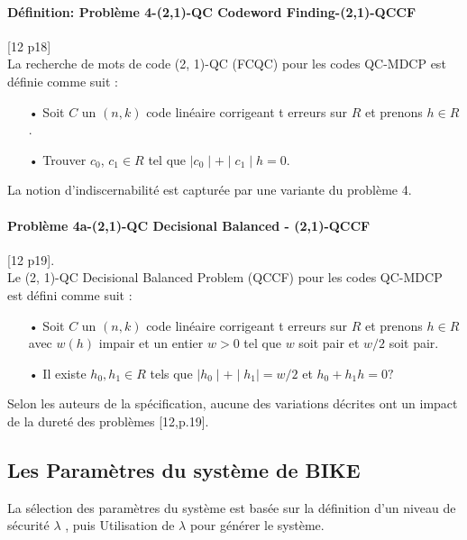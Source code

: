 \documentclass[12pt,openany]{report}
\begin{document}
\paragraph{Définition: Problème 4-(2,1)-QC Codeword Finding-(2,1)-QCCF}[12 p18]
\\
La recherche de mots de code (2, 1)-QC (FCQC) pour les codes QC-MDCP est définie comme suit :

\begin{itemize}
\item[•] Soit $\mathit{C}$ un $(n,k)$ code linéaire corrigeant t erreurs sur $ \mathit{R}$ et prenons $ h \in \mathit{R}$.
\item[•] Trouver $c_0$, $c_1 \in \mathit{R}$ tel que $ \mid c_0\mid +\mid c_1 \mid h=0$.
\end{itemize}
La notion d’indiscernabilité est capturée par une variante du problème 4.

\paragraph{Problème 4a-(2,1)-QC Decisional Balanced - (2,1)-QCCF}[12 p19].\\
 Le (2, 1)-QC Decisional Balanced Problem (QCCF) pour les codes QC-MDCP
est défini comme suit :

\begin{itemize}
\item[•] Soit $ \mathit{C}$ un $(n,k)$ code linéaire corrigeant t erreurs sur $\mathit{R}$ et prenons $ h\in \mathit{R}$ avec $ w(h)$ impair et un entier $ w >0$ tel que $w$ soit pair et $w/2$ soit pair.
\item[•] Il existe $h_0, h_1 \in \mathit{R}$ tels que $ \mid h_0 \mid + \mid h_1 \mid =w/2$ et $ h_0 +h_1h=0?$
\end{itemize}
Selon les auteurs de la spécification, aucune des variations décrites
ont un impact de la dureté des problèmes [12,p.19].

\subsection{Les Paramètres du système de BIKE}

La sélection des paramètres du système est basée sur la définition d’un niveau de sécurité $\lambda$
, puis
Utilisation de $\lambda$ pour générer le système.\\
\hrulefill
\end{document}
